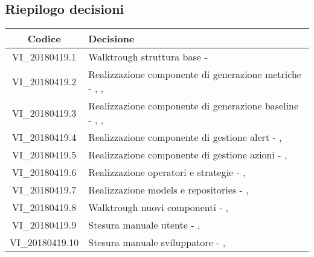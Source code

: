 \subsection{Riepilogo decisioni}

\begin{center}
    \begin{tabular}{c | p{12cm}}
        \centering
        \rowcolor[gray]{.9} { \textbf{Codice} } & { \textbf{Decisione} } \\ 
        \hline
        \rowcolor[gray]{.8} VI\_20180419.1 & Walktrough struttura base - \Leonardo{} \\
        \rowcolor[gray]{.9} VI\_20180419.2 & Realizzazione componente di generazione metriche - \Luca{}, \Mattia{}, \Carlo{} \\
        \rowcolor[gray]{.8} VI\_20180419.3 & Realizzazione componente di generazione baseline - \Mattia{}, \Carlo{}, \Isacco{} \\
        \rowcolor[gray]{.9} VI\_20180419.4 & Realizzazione componente di gestione alert - \Carlo{}, \Isacco{} \\
        \rowcolor[gray]{.8} VI\_20180419.5 & Realizzazione componente di gestione azioni - \Isacco{}, \Luca{} \\
        \rowcolor[gray]{.9} VI\_20180419.6 & Realizzazione operatori e strategie - \Luca{}, \Mattia{} \\
        \rowcolor[gray]{.8} VI\_20180419.7 & Realizzazione models e repositories - \Mattia{}, \Carlo{} \\
	\rowcolor[gray]{.9} VI\_20180419.8 & Walktrough nuovi componenti - \Tommaso{}, \Cristian{} \\
        \rowcolor[gray]{.8} VI\_20180419.9 & Stesura manuale utente - \Leonardo{}, \Carlo{} \\
        \rowcolor[gray]{.9} VI\_20180419.10 & Stesura manuale sviluppatore - \Leonardo{}, \Luca{} \\
    \end{tabular}
\end{center}
